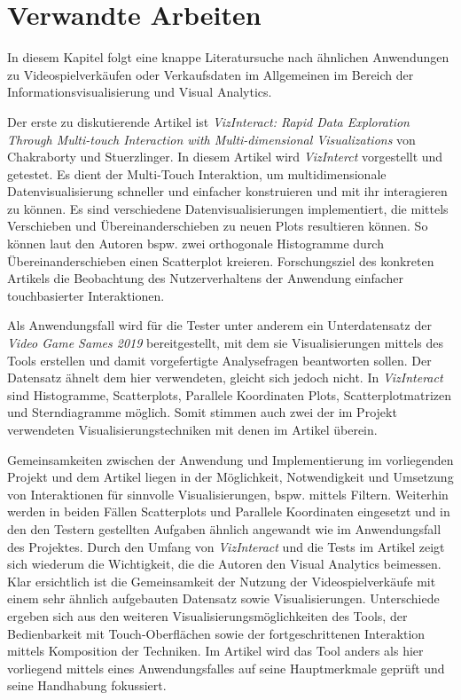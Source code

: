 \documentclass[usegeometry=true]{scrartcl}
\begin{document}
\section{Verwandte Arbeiten}
In diesem Kapitel folgt eine knappe Literatursuche nach ähnlichen Anwendungen zu Videospielverkäufen oder Verkaufsdaten im Allgemeinen im Bereich der Informationsvisualisierung und Visual Analytics. 

Der erste zu diskutierende Artikel ist \textit{VizInteract: Rapid Data Exploration Through Multi-touch Interaction with Multi-dimensional Visualizations} von Chakraborty und Stuerzlinger.\cite{Chakraborty.2021}
In diesem Artikel wird \textit{VizInterct} vorgestellt und getestet. 
Es dient der Multi-Touch Interaktion, um multidimensionale Datenvisualisierung schneller und einfacher konstruieren und mit ihr interagieren zu können.
Es sind verschiedene Datenvisualisierungen implementiert, die mittels Verschieben und Übereinanderschieben zu neuen Plots resultieren können. 
So können laut den Autoren bspw. zwei orthogonale Histogramme durch Übereinanderschieben einen Scatterplot kreieren. 
Forschungsziel des konkreten Artikels die Beobachtung des Nutzerverhaltens der Anwendung einfacher touchbasierter Interaktionen.

Als Anwendungsfall wird für die Tester unter anderem ein Unterdatensatz der \textit{Video Game Sames 2019} bereitgestellt, mit dem sie Visualisierungen mittels des Tools erstellen und damit vorgefertigte Analysefragen beantworten sollen.
Der Datensatz ähnelt dem hier verwendeten, gleicht sich jedoch nicht. 
In \textit{VizInteract} sind Histogramme, Scatterplots, Parallele Koordinaten Plots, Scatterplotmatrizen und Sterndiagramme möglich. 
Somit stimmen auch zwei der im Projekt verwendeten Visualisierungstechniken mit denen im Artikel überein. 

Gemeinsamkeiten zwischen der Anwendung und Implementierung im vorliegenden Projekt und dem Artikel liegen in der Möglichkeit, Notwendigkeit und Umsetzung von Interaktionen für sinnvolle Visualisierungen, bspw. mittels Filtern.
Weiterhin werden in beiden Fällen Scatterplots und Parallele Koordinaten eingesetzt und in den den Testern gestellten Aufgaben ähnlich angewandt wie im Anwendungsfall des Projektes. 
Durch den Umfang von \textit{VizInteract} und die Tests im Artikel zeigt sich wiederum die Wichtigkeit, die die Autoren den Visual Analytics beimessen.
Klar ersichtlich ist die Gemeinsamkeit der Nutzung der Videospielverkäufe mit einem sehr ähnlich aufgebauten Datensatz sowie Visualisierungen.
Unterschiede ergeben sich aus den weiteren Visualisierungsmöglichkeiten des Tools, der Bedienbarkeit mit Touch-Oberflächen sowie der fortgeschrittenen Interaktion mittels Komposition der Techniken. 
Im Artikel wird das Tool anders als hier vorliegend mittels eines Anwendungsfalles auf seine Hauptmerkmale geprüft und seine Handhabung fokussiert.
\end{document}
